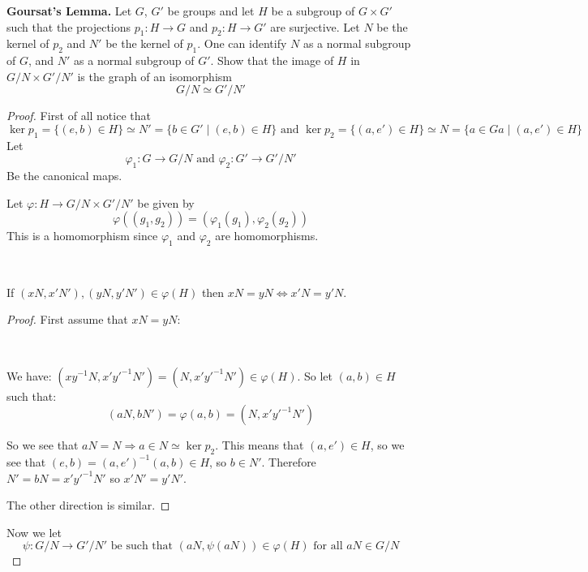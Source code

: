 \begin{exercise}


\textbf{Goursat's Lemma.} Let $G$, $G'$ be groups and let $H$ be a subgroup of $G\times G'$ such that the projections $p_1\colon H\rightarrow G$ and $p_2\colon H\rightarrow G'$ are surjective. Let $N$ be the kernel of $p_2$ and $N'$ be the kernel of $p_1$. One can identify $N$ as a normal subgroup of $G$, and $N'$ as a normal subgroup of $G'$. Show that the image of $H$ in $G/N\times G'/N'$ is the graph of an isomorphism \[G/N\simeq G'/N'\]

\begin{proof}
First of all notice that \begin{equation*}
\ker p_1 = \{(e,b)\in H\}\simeq N' = \{b\in G' \mid (e,b)\in H\}\text{ and }\ker p_2 = \{(a,e')\in H\} \simeq N = \{a\in Ga \mid (a,e')\in H\}
\end{equation*} 
Let \begin{equation*}
\varphi_1\colon G\rightarrow G/N \text{ and } \varphi_2\colon G'\rightarrow G'/N'
\end{equation*}
Be the canonical maps.

Let $\varphi\colon H\rightarrow G/N\times G'/N'$ be given by \[\varphi((g_1,g_2)) = (\varphi_1(g_1),\varphi_2(g_2)) \]
This is a homomorphism since $\varphi_1$ and $\varphi_2$ are homomorphisms.

\
\begin{lemma} \label{lem1}
If $(xN,x'N'), (yN,y'N')\in \varphi(H)$ then $xN = yN \iff x'N = y'N$.    
\end{lemma}
\begin{proof}
First assume that $xN = yN$:

\

We have: $(xy^{-1}N,{x'}{y'}^{-1}N') = (N,{x'}{y'}^{-1}N') \in \varphi(H)$. So let $(a,b)\in H$ such that:\begin{equation*}
(aN,bN') = \varphi(a,b) = (N,{x'}{y'}^{-1}N')
\end{equation*}

So we see that $aN = N \Rightarrow a\in N \simeq \ker p_2$. This means that $(a,e')\in H$, so we see that $(e,b) = (a,e')^{-1}(a,b)\in H$, so $b\in N'$. Therefore $N' = bN = {x'}{y'}^{-1}N'$ so $x'N' = y'N'$.

The other direction is similar.
\end{proof}

Now we let \begin{equation*}
\psi\colon G/N \rightarrow G'/N' \text{ be such that } (aN, \psi(aN)) \in \varphi(H) \text{ for all }aN\in G/N
\end{equation*}


\end{proof}
\end{exercise}
